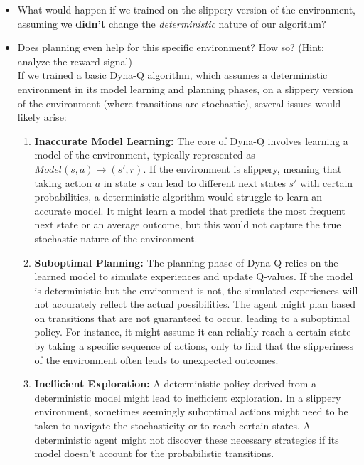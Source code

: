 \begin{itemize}
    \item What would happen if we trained on the slippery version of the environment, assuming we \textbf{didn't} change the \textit{deterministic} nature of our algorithm? 
    \item Does planning even help for this specific environment? How so? (Hint: analyze the reward signal) \\
    If we trained a basic Dyna-Q algorithm, which assumes a deterministic environment in its model learning and planning phases, on a slippery version of the environment (where transitions are stochastic), several issues would likely arise:

\begin{enumerate}
    \item \textbf{Inaccurate Model Learning:} The core of Dyna-Q involves learning a model of the environment, typically represented as $Model(s, a) \rightarrow (s', r)$. If the environment is slippery, meaning that taking action $a$ in state $s$ can lead to different next states $s'$ with certain probabilities, a deterministic algorithm would struggle to learn an accurate model. It might learn a model that predicts the most frequent next state or an average outcome, but this would not capture the true stochastic nature of the environment.

    \item \textbf{Suboptimal Planning:} The planning phase of Dyna-Q relies on the learned model to simulate experiences and update Q-values. If the model is deterministic but the environment is not, the simulated experiences will not accurately reflect the actual possibilities. The agent might plan based on transitions that are not guaranteed to occur, leading to a suboptimal policy. For instance, it might assume it can reliably reach a certain state by taking a specific sequence of actions, only to find that the slipperiness of the environment often leads to unexpected outcomes.

    \item \textbf{Inefficient Exploration:} A deterministic policy derived from a deterministic model might lead to inefficient exploration. In a slippery environment, sometimes seemingly suboptimal actions might need to be taken to navigate the stochasticity or to reach certain states. A deterministic agent might not discover these necessary strategies if its model doesn't account for the probabilistic transitions.
\end{enumerate}


\end{itemize}

